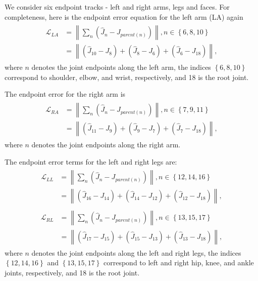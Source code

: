 \documentclass[nohyperref]{article}
\theoremstyle{plain}
\theoremstyle{definition}
\theoremstyle{remark}
\begin{document}
We consider six endpoint tracks - left and right arms, legs and faces. For completeness, here is the endpoint error equation for the left arm (LA) again
\begin{align}
\label{eqn:left_arm}
\begin{split}
\mathcal{L}_{LA} &= \left \| \sum_n (\hat{J}_n - J_{parent(n)})\right \|,  n\in \left \{ 6,8,10\right \}
\\
&=  \left \| \left (\hat{J}_{10} - {J}_{8} \right ) + \left (\hat{J}_{8} - {J}_{6} \right ) + \left (\hat{J}_{6} - {J}_{18} \right ) \right \| ,
\end{split}
\end{align}
where $n$ denotes the joint endpoints along the left arm, the indices $\left \{ 6,8,10\right \}$ correspond to shoulder, elbow, and wrist, respectively, and 18 is the root joint. 

The endpoint error for the right arm is
\begin{align}
\label{eqn:rightarm}
\begin{split}
\mathcal{L}_{RA} &= \left \| \sum_n (\hat{J}_n - J_{parent(n)})\right \|,  n\in \left \{ 7,9,11\right \}
\\
&= \left \|  \left (\hat{J}_{11} - {J}_{9} \right ) + \left (\hat{J}_{9} - {J}_{7} \right ) + \left (\hat{J}_{7} - {J}_{18} \right ) \right \| ,
\end{split}
\end{align}
where $n$ denotes the joint endpoints along the right arm.

The endpoint error terms for the left and right legs are:
\begin{align}
\label{eqn:leftleg}
\begin{split}
\mathcal{L}_{LL} &= \left \| \sum_n (\hat{J}_n - J_{parent(n)})\right \|,  n\in \left \{ 12,14,16\right \}
\\
&= \left \|  \left (\hat{J}_{16} - {J}_{14} \right ) + \left (\hat{J}_{14} - {J}_{12} \right ) + \left (\hat{J}_{12} - {J}_{18} \right ) \right \| ,
\end{split}
\end{align}
\begin{align}
\label{eqn:rightleg}
\begin{split}
\mathcal{L}_{RL} &= \left \| \sum_n (\hat{J}_n - J_{parent(n)})\right \|,  n\in \left \{ 13,15,17\right \}
\\
&=  \left \| \left (\hat{J}_{17} - {J}_{15} \right ) + \left (\hat{J}_{15} - {J}_{13} \right ) + \left (\hat{J}_{13} - {J}_{18} \right ) \right \| ,
\end{split}
\end{align}
where $n$ denotes the joint endpoints along the left and right legs, the indices  $\left \{ 12,14,16\right \}$ and $\left \{ 13, 15,17\right \}$ correspond to left and right hip, knee, and ankle joints, respectively, and 18 is the root joint. 
\end{document}
